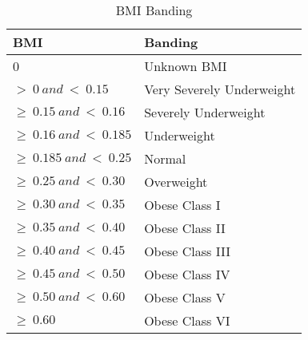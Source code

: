 \begin{table}[ht]
  \begin{center}
    \caption{BMI Banding}
    \label{tab:BMIBanding}
    \begin{tabular}{|l|l|} %
      \hline
      \textbf{BMI}            & \textbf{Banding}          \\
      \hline
      0                       & Unknown BMI               \\
      \hline
      $>~0~and~<~0.15$        & Very Severely Underweight \\
      \hline
      $\geq~0.15~and~<~0.16$  & Severely Underweight      \\
      \hline
      $\geq~0.16~and~<~0.185$ & Underweight               \\
      \hline
      $\geq~0.185~and~<~0.25$ & Normal                    \\
      \hline
      $\geq~0.25~and~<~0.30$  & Overweight                \\
      \hline
      $\geq~0.30~and~<~0.35$  & Obese Class I             \\
      \hline
      $\geq~0.35~and~<~0.40$  & Obese Class II            \\
      \hline
      $\geq~0.40~and~<~0.45$  & Obese Class III           \\
      \hline
      $\geq~0.45~and~<~0.50$  & Obese Class IV            \\
      \hline
      $\geq~0.50~and~<~0.60$  & Obese Class V             \\
      \hline
      $\geq~0.60$             & Obese Class VI            \\
      \hline
    \end{tabular}
  \end{center}
\end{table}

